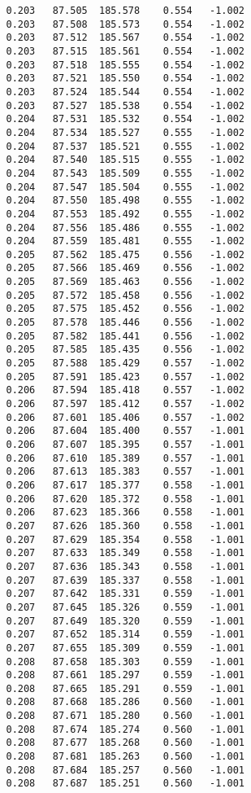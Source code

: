 \begin{verbatim}
   0.203   87.505  185.578    0.554   -1.002
   0.203   87.508  185.573    0.554   -1.002
   0.203   87.512  185.567    0.554   -1.002
   0.203   87.515  185.561    0.554   -1.002
   0.203   87.518  185.555    0.554   -1.002
   0.203   87.521  185.550    0.554   -1.002
   0.203   87.524  185.544    0.554   -1.002
   0.203   87.527  185.538    0.554   -1.002
   0.204   87.531  185.532    0.554   -1.002
   0.204   87.534  185.527    0.555   -1.002
   0.204   87.537  185.521    0.555   -1.002
   0.204   87.540  185.515    0.555   -1.002
   0.204   87.543  185.509    0.555   -1.002
   0.204   87.547  185.504    0.555   -1.002
   0.204   87.550  185.498    0.555   -1.002
   0.204   87.553  185.492    0.555   -1.002
   0.204   87.556  185.486    0.555   -1.002
   0.204   87.559  185.481    0.555   -1.002
   0.205   87.562  185.475    0.556   -1.002
   0.205   87.566  185.469    0.556   -1.002
   0.205   87.569  185.463    0.556   -1.002
   0.205   87.572  185.458    0.556   -1.002
   0.205   87.575  185.452    0.556   -1.002
   0.205   87.578  185.446    0.556   -1.002
   0.205   87.582  185.441    0.556   -1.002
   0.205   87.585  185.435    0.556   -1.002
   0.205   87.588  185.429    0.557   -1.002
   0.205   87.591  185.423    0.557   -1.002
   0.206   87.594  185.418    0.557   -1.002
   0.206   87.597  185.412    0.557   -1.002
   0.206   87.601  185.406    0.557   -1.002
   0.206   87.604  185.400    0.557   -1.001
   0.206   87.607  185.395    0.557   -1.001
   0.206   87.610  185.389    0.557   -1.001
   0.206   87.613  185.383    0.557   -1.001
   0.206   87.617  185.377    0.558   -1.001
   0.206   87.620  185.372    0.558   -1.001
   0.206   87.623  185.366    0.558   -1.001
   0.207   87.626  185.360    0.558   -1.001
   0.207   87.629  185.354    0.558   -1.001
   0.207   87.633  185.349    0.558   -1.001
   0.207   87.636  185.343    0.558   -1.001
   0.207   87.639  185.337    0.558   -1.001
   0.207   87.642  185.331    0.559   -1.001
   0.207   87.645  185.326    0.559   -1.001
   0.207   87.649  185.320    0.559   -1.001
   0.207   87.652  185.314    0.559   -1.001
   0.207   87.655  185.309    0.559   -1.001
   0.208   87.658  185.303    0.559   -1.001
   0.208   87.661  185.297    0.559   -1.001
   0.208   87.665  185.291    0.559   -1.001
   0.208   87.668  185.286    0.560   -1.001
   0.208   87.671  185.280    0.560   -1.001
   0.208   87.674  185.274    0.560   -1.001
   0.208   87.677  185.268    0.560   -1.001
   0.208   87.681  185.263    0.560   -1.001
   0.208   87.684  185.257    0.560   -1.001
   0.208   87.687  185.251    0.560   -1.001

\end{verbatim}
